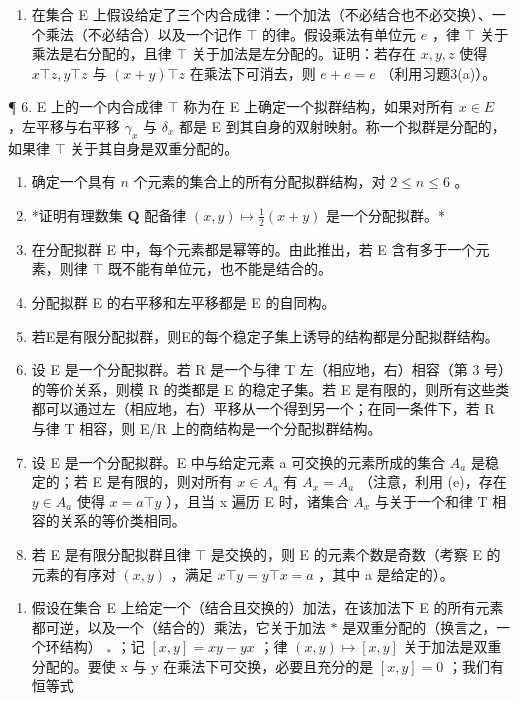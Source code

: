 \begin{enumerate}
\def\labelenumi{\arabic{enumi}.}
\setcounter{enumi}{4}
\tightlist
\item
  在集合 E 上假设给定了三个内合成律：一个加法（不必结合也不必交换）、一个乘法（不必结合）以及一个记作 \(\top\) 的律。假设乘法有单位元 \(e\) ，律 \(\top\) 关于乘法是右分配的，且律 \(\top\) 关于加法是左分配的。证明：若存在 \(x, y, z\) 使得 \(x \top z, y \top z\) 与 \((x + y) \top z\) 在乘法下可消去，则 \(e + e = e\) （利用习题3(a)）。
\end{enumerate}

¶ 6. E 上的一个内合成律 \(\top\) 称为在 E 上确定一个拟群结构，如果对所有 \(x \in E\) ，左平移与右平移 \(\gamma_x\) 与 \(\delta_x\) 都是 E 到其自身的双射映射。称一个拟群是分配的，如果律 \(\top\) 关于其自身是双重分配的。

\begin{enumerate}
\def\labelenumi{(\alph{enumi})}
\item
  确定一个具有 \(n\) 个元素的集合上的所有分配拟群结构，对 \(2 \leqslant n \leqslant 6\) 。
\item
  *证明有理数集 \(\mathbf{Q}\) 配备律 \((x,y)\mapsto\frac{1}{2}(x+y)\) 是一个分配拟群。*
\item
  在分配拟群 E 中，每个元素都是幂等的。由此推出，若 E 含有多于一个元素，则律 \(\top\) 既不能有单位元，也不能是结合的。
\item
  分配拟群 E 的右平移和左平移都是 E 的自同构。
\item
  若E是有限分配拟群，则E的每个稳定子集上诱导的结构都是分配拟群结构。
\item
  设 E 是一个分配拟群。若 R 是一个与律 T 左（相应地，右）相容（第 3 号）的等价关系，则模 R 的类都是 E 的稳定子集。若 E 是有限的，则所有这些类都可以通过左（相应地，右）平移从一个得到另一个；在同一条件下，若 R 与律 T 相容，则 E/R 上的商结构是一个分配拟群结构。
\item
  设 E 是一个分配拟群。E 中与给定元素 a 可交换的元素所成的集合 \(A_{a}\) 是稳定的；若 E 是有限的，则对所有 \(x \in A_{a}\) 有 \(A_{x} = A_{a}\) （注意，利用 (e)，存在 \(y \in A_{a}\) 使得 \(x = a \top y\) ），且当 x 遍历 E 时，诸集合 \(A_{x}\) 与关于一个和律 T 相容的关系的等价类相同。
\item
  若 E 是有限分配拟群且律 \(\top\) 是交换的，则 E 的元素个数是奇数（考察 E 的元素的有序对 \((x,y)\) ，满足 \(x\top y=y\top x=a\) ，其中 a 是给定的）。
\end{enumerate}

\begin{enumerate}
\def\labelenumi{\arabic{enumi}.}
\setcounter{enumi}{6}
\tightlist
\item
  假设在集合 E 上给定一个（结合且交换的）加法，在该加法下 E 的所有元素都可逆，以及一个（结合的）乘法，它关于加法 \(*\) 是双重分配的（换言之，一个环结构） \(_{*}\) ；记 \([x,y]=xy-yx\) ；律 \((x,y)\mapsto[x,y]\) 关于加法是双重分配的。要使 x 与 y 在乘法下可交换，必要且充分的是 \([x,y]=0\) ；我们有恒等式
\end{enumerate}

